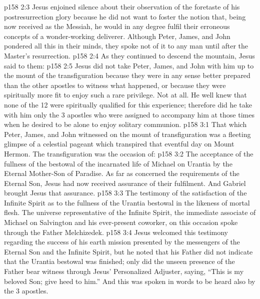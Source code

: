 \vs p158 2:3 Jesus enjoined silence about their observation of the foretaste of his postresurrection glory because he did not want to foster the notion that, being now received as the Messiah, he would in any degree fulfil their erroneous concepts of a wonder\hyp{}working deliverer. Although Peter, James, and John pondered all this in their minds, they spoke not of it to any man until after the Master’s resurrection.
\vs p158 2:4 As they continued to descend the mountain, Jesus said to them: 
\vs p158 2:5 Jesus did not take Peter, James, and John with him up to the mount of the transfiguration because they were in any sense better prepared than the other apostles to witness what happened, or because they were spiritually more fit to enjoy such a rare privilege. Not at all. He well knew that none of the 12 were spiritually qualified for this experience; therefore did he take with him only the 3 apostles who were assigned to accompany him at those times when he desired to be alone to enjoy solitary communion.
\vs p158 3:1 That which Peter, James, and John witnessed on the mount of transfiguration was a fleeting glimpse of a celestial pageant which transpired that eventful day on Mount Hermon. The transfiguration was the occasion of:
\vs p158 3:2 \bibnobreakspace The acceptance of the fullness of the bestowal of the incarnated life of Michael on Urantia by the Eternal Mother\hyp{}Son of Paradise. As far as concerned the requirements of the Eternal Son, Jesus had now received assurance of their fulfilment. And Gabriel brought Jesus that assurance.
\vs p158 3:3 \bibnobreakspace The testimony of the satisfaction of the Infinite Spirit as to the fullness of the Urantia bestowal in the likeness of mortal flesh. The universe representative of the Infinite Spirit, the immediate associate of Michael on Salvington and his ever\hyp{}present coworker, on this occasion spoke through the Father Melchizedek.
\vs p158 3:4 \pc Jesus welcomed this testimony regarding the success of his earth mission presented by the messengers of the Eternal Son and the Infinite Spirit, but he noted that his Father did not indicate that the Urantia bestowal was finished; only did the unseen presence of the Father bear witness through Jesus’ Personalized Adjuster, saying, “This is my beloved Son; give heed to him.” And this was spoken in words to be heard also by the 3 apostles.
